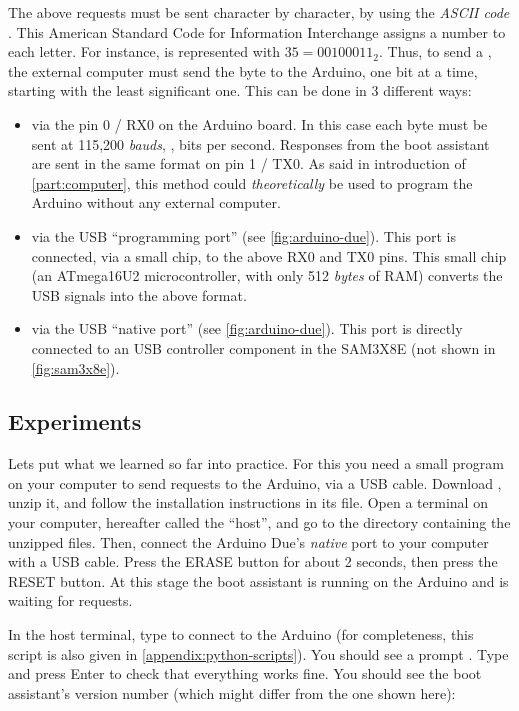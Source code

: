 The above requests must be sent character by character, by using the {\em ASCII
code} \cite{ASCII}. This American Standard Code for Information Interchange
assigns a number to each letter. For instance, \code{\#} is represented with
$35=00100011_2$. Thus, to send a \code{\#}, the external computer must send the
byte  to the Arduino, one bit at a time, starting with the least
significant one. This can be done in 3 different ways:
\begin{itemize}
  \item via the pin 0 / RX0 on the Arduino board. In this case each byte must
  be sent at 115,200 {\em bauds}, \ie, bits per second. Responses from the boot
  assistant are sent in the same format on pin 1 / TX0. As said in introduction
  of \cref{part:computer}, this method could {\em theoretically} be used to
  program the Arduino without any external computer.

  \item via the USB ``programming port'' (see \cref{fig:arduino-due}). This
  port is connected, via a small chip, to the above RX0 and TX0 pins. This
  small chip (an ATmega16U2 microcontroller, with only 512 {\em bytes} of RAM)
  converts the USB signals into the above format.

  \item via the USB ``native port'' (see \cref{fig:arduino-due}). This port is
  directly connected to an USB controller component in the SAM3X8E (not shown
  in \cref{fig:sam3x8e}).
\end{itemize}

\subsection{Experiments}\label{section:boot-assistant-first-steps}

Lets put what we learned so far into practice. For this you need a small
program on your computer to send requests to the Arduino, via a USB cable.
Download , unzip it, and follow the installation
instructions in its  file. Open a terminal on your computer,
hereafter called the ``host'', and go to the directory containing the unzipped
files. Then, connect the Arduino Due's {\em native} port to your computer with
a USB cable. Press the ERASE button for about 2 seconds, then press the RESET
button. At this stage the boot assistant is running on the Arduino and is
waiting for requests.

In the host terminal, type  to connect to the
Arduino (for completeness, this script is also given in
\cref{appendix:python-scripts}). You should see a prompt \code{>}. Type
 and press Enter to check that everything works fine. You should see
the boot assistant's version number (which might differ from the one shown
here):

